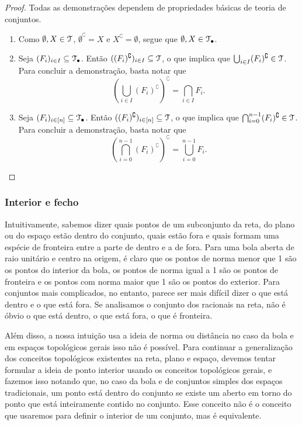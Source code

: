 \begin{proof} Todas as demonstrações dependem de propriedades básicas de teoria de conjuntos.
	\begin{enumerate}
	\item Como $\emptyset,X \in \mathcal{T}$, $\emptyset^\complement = X$ e $X^\complement = \emptyset$, segue que $\emptyset,X \in \mathcal{T}_{\bullet}$.
	
	\item  Seja $(F_i)_{i \in I} \subseteq \mathcal{T}_{\bullet}$. Então $((F_i)^\complement)_{i \in I} \subseteq \mathcal{T}$, o que implica que $\bigcup_{i \in I} (F_i)^\complement \in \mathcal{T}$. Para concluir a demonstração, basta notar que
	\begin{equation*}
	\left( \bigcup_{i \in I} (F_i)^\complement \right)^\complement = \bigcap_{i \in I} F_i.
	\end{equation*}
	
	\item Seja $(F_i)_{i \in [n]} \subseteq \mathcal{T}_{\bullet}$. Então $((F_i)^\complement)_{i \in [n]} \subseteq \mathcal{T}$, o que implica que $\bigcap_{i=0}^{n-1} (F_i)^\complement \in \mathcal{T}$. Para concluir a demonstração, basta notar que
	\begin{equation*}
	\left( \bigcap_{i=0}^{n-1} (F_i)^\complement \right)^\complement = \bigcup_{i=0}^{n-1} F_i.
	\end{equation*}
\qedhere
	\end{enumerate}
\end{proof}

\subsubsection{Interior e fecho}

	Intuitivamente, sabemos dizer quais pontos de um subconjunto da reta, do plano ou do espaço estão dentro do conjunto, quais estão fora e quais formam uma espécie de fronteira entre a parte de dentro e a de fora. Para uma bola aberta de raio unitário e centro na origem, é claro que os pontos de norma menor que 1 são os pontos do interior da bola, os pontos de norma igual a 1 são os pontos de fronteira e os pontos com norma maior que 1 são os pontos do exterior. Para conjuntos mais complicados, no entanto, parece ser mais difícil dizer o que está dentro e o que está fora. Se analisamos o conjunto dos racionais na reta, não é óbvio o que está dentro, o que está fora, o que é fronteira.
	
	Além disso, a nossa intuição usa a ideia de norma ou distância no caso da bola e em espaços topológicos gerais isso não é possível. Para continuar a generalização dos conceitos topológicos existentes na reta, plano e espaço, devemos tentar formular a ideia de ponto interior usando os conceitos topológicos gerais, e fazemos isso notando que, no caso da bola e de conjuntos simples dos espaços tradicionais, um ponto está dentro do conjunto se existe um aberto em torno do ponto que está inteiramente contido no conjunto. Esse conceito não é o conceito que usaremos para definir o interior de um conjunto, mas é equivalente.
	
